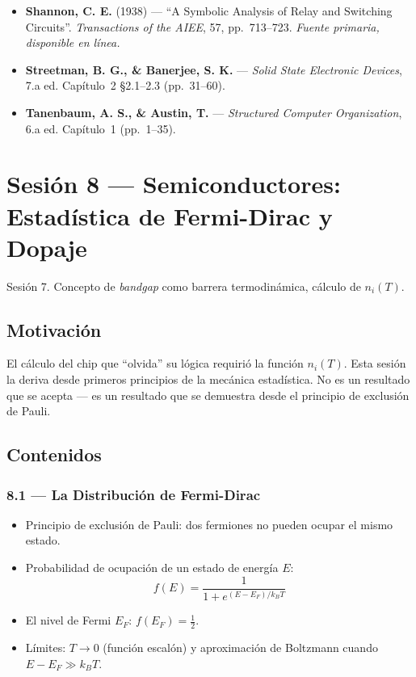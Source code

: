 \documentclass[11pt, letterpaper]{article}
\begin{document}
\begin{lecturas}
\begin{itemize}
  \item[$(\star)$] \textbf{Shannon, C. E.} (1938) --- ``A Symbolic Analysis of Relay and Switching Circuits''. \textit{Transactions of the AIEE}, 57, pp.\ 713--723. \textit{Fuente primaria, disponible en l\'inea.}
  \item[$(\star)$] \textbf{Streetman, B. G., \& Banerjee, S. K.} --- \emph{Solid State Electronic Devices}, 7.a ed. Cap\'itulo~2 \S2.1--2.3 (pp.\ 31--60).
  \item \textbf{Tanenbaum, A. S., \& Austin, T.} --- \emph{Structured Computer Organization}, 6.a ed. Cap\'itulo~1 (pp.\ 1--35).
\end{itemize}
\end{lecturas}

\newpage

\section{Sesi\'on 8 --- Semiconductores: Estad\'istica de Fermi-Dirac y Dopaje}

\begin{prereqs}
Sesi\'on 7. Concepto de \emph{bandgap} como barrera termodin\'amica, c\'alculo de $n_i(T)$.
\end{prereqs}

\subsection*{Motivaci\'on}
El c\'alculo del chip que ``olvida'' su l\'ogica requiri\'o la funci\'on $n_i(T)$. Esta sesi\'on la deriva desde primeros principios de la mec\'anica estad\'istica. No es un resultado que se acepta --- es un resultado que se demuestra desde el principio de exclusi\'on de Pauli.

\subsection{Contenidos}

\subsubsection{8.1 --- La Distribuci\'on de Fermi-Dirac}
\begin{itemize}
  \item Principio de exclusi\'on de Pauli: dos fermiones no pueden ocupar el mismo estado.
  \item Probabilidad de ocupaci\'on de un estado de energ\'ia $E$:
    \[f(E)=\frac{1}{1+e^{(E-E_F)/k_BT}}\]
  \item El nivel de Fermi $E_F$: $f(E_F)=\frac{1}{2}$.
  \item L\'imites: $T\to 0$ (funci\'on escal\'on) y aproximaci\'on de Boltzmann cuando $E-E_F\gg k_BT$.
\end{itemize}
\end{document}

